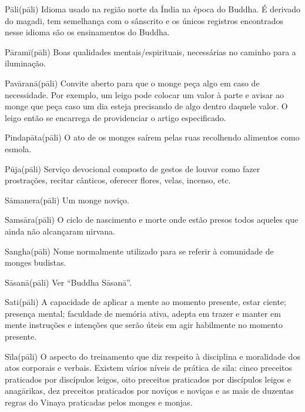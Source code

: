 \begin{glossarydescription}
\item[{{Pāli}{(pāli)}}] Idioma usado na região norte da Índia na época do Buddha. É derivado do magadi, tem semelhança com o sânscrito e os únicos registros encontrados nesse idioma são os ensinamentos do Buddha.

\item[{{Pāramī}{(pāli)}}] Boas qualidades mentais/espirituais, necessárias no caminho para a iluminação.

\item[{{Pavāranā}{(pāli)}}] Convite aberto para que o monge peça algo em caso de necessidade. Por exemplo, um leigo pode colocar um valor à parte e avisar ao monge que peça caso um dia esteja precisando de algo dentro daquele valor. O leigo então se encarrega de providenciar o artigo especificado.

\item[{{Pindapāta}{(pāli)}}] O ato de os monges saírem pelas ruas recolhendo alimentos como esmola.

\item[{{Pūja}{(pāli)}}] Serviço devocional composto de gestos de louvor como fazer prostrações, recitar cânticos, oferecer flores, velas, incenso, etc.

\item[{{Sāmanera}{(pāli)}}] Um monge noviço.

\item[{{Samsāra}{(pāli)}}] O ciclo de nascimento e morte onde estão presos todos aqueles que ainda não alcançaram nirvana.

\item[{{Sangha}{(pāli)}}] Nome normalmente utilizado para se referir à comunidade de monges budistas.

\item[{{Sāsanā}{(pāli)}}] Ver ``Buddha Sāsanā''.

\item[{{Sati}{(pāli)}}] A capacidade de aplicar a mente ao momento presente, estar ciente; presença mental; faculdade de memória ativa, adepta em trazer e manter em mente instruções e intenções que serão úteis em agir habilmente no momento presente.

\item[{{Sīla}{(pāli)}}] O aspecto do treinamento que diz respeito à disciplina e moralidade dos atos corporais e verbais. Existem vários níveis de prática de sīla: cinco preceitos praticados por discípulos leigos, oito preceitos praticados por discípulos leigos e anagārikas, dez preceitos praticados por noviços e noviças e as mais de duzentas regras do Vinaya praticadas pelos monges e monjas.


\end{glossarydescription}
